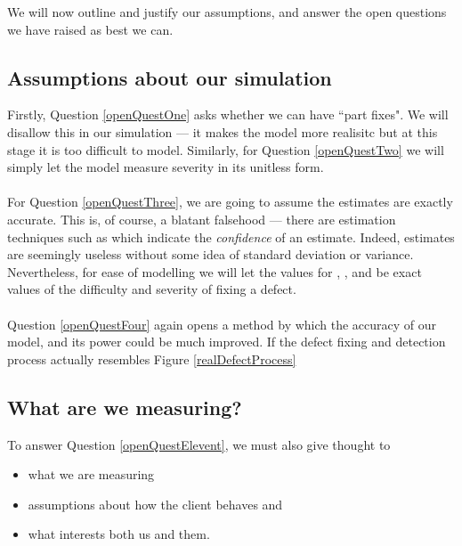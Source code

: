 We will now outline and justify our assumptions, and answer the open questions we have raised as
best we can.

\subsection{Assumptions about our simulation}

Firstly, Question \ref{openQuestOne} asks whether we can have ``part fixes".
We will disallow this in our simulation --- it makes the model more realisitc but at this stage it
is too difficult to model.
Similarly, for Question \ref{openQuestTwo} we will simply let the model measure severity in its
unitless form.\\
\\
For Question \ref{openQuestThree}, we are going to assume the estimates are exactly accurate.
This is, of course, a blatant falsehood --- there are estimation techniques such as \FIXME which
indicate the {\em confidence} of an estimate.
Indeed, estimates are seemingly useless without some idea of standard deviation or variance.
Nevertheless, for ease of modelling we will let the values for \easy, \hard, \minor and \major be
exact values of the difficulty and severity of fixing a defect.\\
\\
Question \ref{openQuestFour} again opens a method by which the accuracy of our model, and its power
could be much improved.
If the defect fixing and detection process actually resembles Figure \ref{realDefectProcess}

\subsection{What are we measuring?}

To answer Question \ref{openQuestElevent}, we must also give thought to 
\begin{itemize}
	\item what we are measuring
	\item assumptions about how the client behaves and
	\item what interests both us and them.
\end{itemize}

